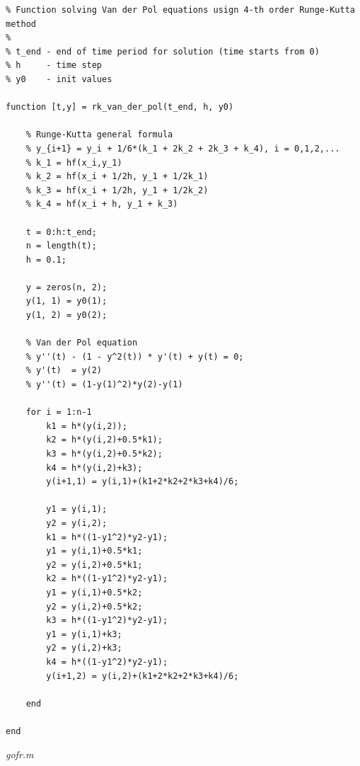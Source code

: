 \begin{lstlisting}
% Function solving Van der Pol equations usign 4-th order Runge-Kutta method
%
% t_end - end of time period for solution (time starts from 0)
% h     - time step
% y0    - init values

function [t,y] = rk_van_der_pol(t_end, h, y0)

    % Runge-Kutta general formula
    % y_{i+1} = y_i + 1/6*(k_1 + 2k_2 + 2k_3 + k_4), i = 0,1,2,...
    % k_1 = hf(x_i,y_1)
    % k_2 = hf(x_i + 1/2h, y_1 + 1/2k_1)
    % k_3 = hf(x_i + 1/2h, y_1 + 1/2k_2)    
    % k_4 = hf(x_i + h, y_1 + k_3)
    
    t = 0:h:t_end;
    n = length(t);
    h = 0.1;

    y = zeros(n, 2);
    y(1, 1) = y0(1);
    y(1, 2) = y0(2);
    
    % Van der Pol equation 
    % y''(t) - (1 - y^2(t)) * y'(t) + y(t) = 0;
    % y'(t)  = y(2)
    % y''(t) = (1-y(1)^2)*y(2)-y(1)

    for i = 1:n-1
        k1 = h*(y(i,2));
        k2 = h*(y(i,2)+0.5*k1);
        k3 = h*(y(i,2)+0.5*k2);
        k4 = h*(y(i,2)+k3);
        y(i+1,1) = y(i,1)+(k1+2*k2+2*k3+k4)/6;
        
        y1 = y(i,1);
        y2 = y(i,2);
        k1 = h*((1-y1^2)*y2-y1);
        y1 = y(i,1)+0.5*k1;
        y2 = y(i,2)+0.5*k1;
        k2 = h*((1-y1^2)*y2-y1);
        y1 = y(i,1)+0.5*k2;
        y2 = y(i,2)+0.5*k2;
        k3 = h*((1-y1^2)*y2-y1);
        y1 = y(i,1)+k3;
        y2 = y(i,2)+k3;
        k4 = h*((1-y1^2)*y2-y1);
        y(i+1,2) = y(i,2)+(k1+2*k2+2*k3+k4)/6;

    end
    
end

\end{lstlisting}

\textit{gofr.m}

